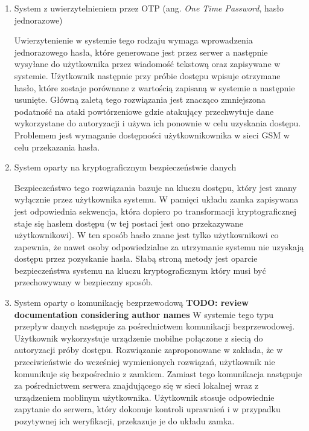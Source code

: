 \begin{enumerate}[label=\Alph*.]
			\item System z uwierzytelnieniem przez OTP (ang. \textit{One Time Password}, hasło jednorazowe)

				Uwierzytenienie w systemie tego rodzaju wymaga wprowadzenia jednorazowego hasła, które generowane jest przez serwer a następnie wysyłane do użytkownika przez wiadomość tekstową oraz zapisywane w systemie. Użytkownik następnie przy próbie dostępu wpisuje otrzymane hasło, które zostaje porównane z wartością zapisaną w systemie a następnie usunięte. Główną zaletą tego rozwiązania jest znacząco zmniejszona podatność na ataki powtórzeniowe gdzie atakujący przechwytuje dane wykorzystane do autoryzacji i używa ich ponownie w celu uzyskania dostępu. Problemem jest wymaganie dostępności użytkownikownika w sieci GSM w celu przekazania hasła.

			\item System oparty na kryptograficznym bezpieczeństwie danych

				Bezpieczeństwo tego rozwiązania bazuje na kluczu dostępu, który jest znany wyłącznie przez użytkownika systemu. W pamięci układu zamka zapisywana jest odpowiednia sekwencja, która dopiero po transformacji kryptograficznej staje się hasłem dostępu (w tej postaci jest ono przekazywane użytkownikowi). W ten sposób hasło znane jest tylko użytkownikowi co zapewnia, że nawet osoby odpowiedzialne za utrzymanie systemu nie uzyskają dostępu przez pozyskanie hasła. Słabą stroną metody jest oparcie bezpieczeństwa systemu na kluczu kryptograficznym który musi być przechowywany w bezpieczny sposób.

			\item System oparty o komunikację bezprzewodową
				\textbf{TODO: review documentation considering author names}
				W systemie tego typu przepływ danych następuje za pośrednictwem komunikacji bezprzewodowej. Użytkownik wykorzystuje urządzenie mobilne połączone z siecią do autoryzacji próby dostępu. Rozwiązanie zaproponowane w \cite{cryptographic-iot-access-system} zakłada, że w przeciwieństwie do wcześniej wymienionych rozwiązań, użytkownik nie komunikuje się bezpośrednio z zamkiem. Zamiast tego komunikacja następuje za pośrednictwem serwera znajdującego się w sieci lokalnej wraz z urządzeniem moblinym użytkownika. Użytkownik stosuje odpowiednie zapytanie do serwera, który dokonuje kontroli uprawnień i w przypadku pozytywnej ich weryfikacji, przekazuje je do układu zamka.

		\end{enumerate}


